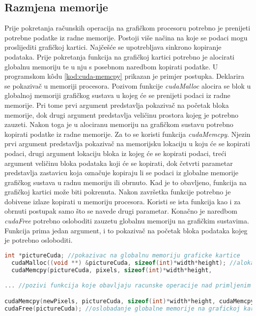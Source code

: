\documentclass[times, utf8, zavrsni, numeric, sort]{fer}
\begin{document}
\subsection{Razmjena memorije}
Prije pokretanja računskih operacija na grafičkom procesoru potrebno je prenijeti potrebne podatke iz radne memorije. Postoji više načina na koje se podaci mogu proslijediti grafičkoj kartici. Najčešće se upotrebljava sinkrono kopiranje podataka. Prije pokretanja funkcija na grafičkoj kartici potrebno je alocirati globalnu memoriju te u nju s posebnom naredbom kopirati podatke. U programskom k\^{o}du \ref{kod:cuda-memcpy} prikazan je primjer postupka. Deklarira se pokazivač u memoriji procesora. Pozivom funkcije \emph{cudaMalloc} alocira se blok u globalnoj memoriji grafičkog sustava u kojeg će se prenijeti podaci iz radne memorije. Pri tome prvi argument predstavlja pokazivač na početak bloka memorije, dok drugi argument predstavlja veličinu prostora kojeg je potrebno zauzeti. Nakon toga je u alociranu memoriju na grafičkom sustavu potrebno kopirati podatke iz radne memorije. Za to se koristi funkcija \emph{cudaMemcpy}. Njezin prvi argument predstavlja pokazivač na memorijsku lokaciju u koju će se kopirati podaci, drugi argument lokaciju bloka iz kojeg će se kopirati podaci, treći argument veličinu bloka podataka koji će se kopirati, dok četvrti parametar predstavlja zastavicu koja označuje kopiraju li se podaci iz globalne memorije grafičkog sustava u radnu memoriju ili obrnuto. Kad je to obavljeno, funkcija na grafičkoj kartici može biti pokrenuta. Nakon završetka funkcije potrebno je dobivene izlaze kopirati u memoriju procesora. Koristi se ista funkcija kao i za obrnuti postupak samo što se navede drugi parametar. Konačno je naredbom \emph{cudaFree} potrebno osloboditi zauzetu globalnu memoriju na grafičkim sustavima. Funkcija prima jedan argument, i to pokazivač na početak bloka podataka kojeg je potrebno osloboditi.

\begin{singlespace}
\begin{lstlisting}[caption={Razmjena podataka između memorija},label=	{kod:cuda-memcpy}, language = {C}]
  int *pictureCuda; //pokazivac na globalnu memoriju graficke kartice
  cudaMalloc((void **) &pictureCuda, sizeof(int)*width*height); //alokacija globalne memorije
  cudaMemcpy(pictureCuda, pixels, sizeof(int)*width*height, 			 cudaMemcpyHostToDevice); //kopiranje iz memorije procesora u globalnu memoriju graficke kartice

... //pozivi funkcija koje obavljaju racunske operacije nad primljenim podatcima

cudaMemcpy(newPixels, pictureCuda, sizeof(int)*width*height, cudaMemcpyDeviceToHost); //kopiranje iz globalne memorije graficke kartice u memoriju procesora
cudaFree(pictureCuda); //oslobadanje globalne memorije na grafickoj kartici

\end{lstlisting}

\end{singlespace}
\end{document}
